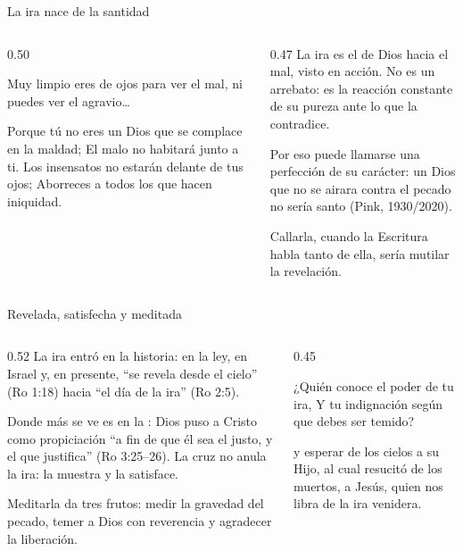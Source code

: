 \begin{frame}{La ira nace de la santidad}
\begin{columns}[t,onlytextwidth]
\begin{column}{0.50\textwidth}
\begin{cita}Muy limpio eres de ojos para ver el mal, ni puedes ver el agravio\ldots{}\end{cita}
\begin{cita}Porque tú no eres un Dios que se complace en la maldad; El malo no habitará junto a ti. Los insensatos no estarán delante de tus ojos; Aborreces a todos los que hacen iniquidad.\end{cita}
\end{column}
\begin{column}{0.47\textwidth}\small
La ira es el  de Dios hacia el mal, visto en acción. No es un arrebato: es la reacción constante de su pureza ante lo que la contradice.\par\medskip
Por eso puede llamarse una perfección de su carácter: un Dios que no se airara contra el pecado no sería santo (Pink, 1930/2020).\par\medskip
Callarla, cuando la Escritura habla tanto de ella, sería mutilar la revelación.
\end{column}
\end{columns}
\end{frame}

\begin{frame}{Revelada, satisfecha y meditada}
\begin{columns}[t,onlytextwidth]
\begin{column}{0.52\textwidth}\small
La ira entró en la historia: en la ley, en Israel y, en presente, ``se revela desde el cielo'' (Ro 1:18) hacia ``el día de la ira'' (Ro 2:5).\par\medskip
Donde más se ve es en la : Dios puso a Cristo como propiciación ``a fin de que él sea el justo, y el que justifica'' (Ro 3:25--26). La cruz no anula la ira: la muestra y la satisface.\par\medskip
Meditarla da tres frutos: medir la gravedad del pecado, temer a Dios con reverencia y agradecer la liberación.
\end{column}
\begin{column}{0.45\textwidth}
\begin{cita}¿Quién conoce el poder de tu ira, Y tu indignación según que debes ser temido?\end{cita}
\begin{cita}y esperar de los cielos a su Hijo, al cual resucitó de los muertos, a Jesús, quien nos libra de la ira venidera.\end{cita}
\end{column}
\end{columns}
\end{frame}

